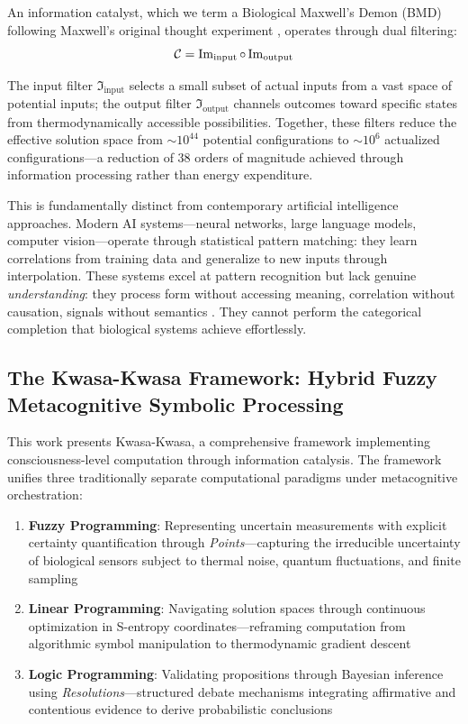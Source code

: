 An information catalyst, which we term a Biological Maxwell's Demon (BMD) following Maxwell's original thought experiment \cite{maxwell1871theory}, operates through dual filtering:
\begin{equation}
\mathcal{C} = \Im_{\text{input}} \circ \Im_{\text{output}}
\end{equation}

The input filter $\Im_{\text{input}}$ selects a small subset of actual inputs from a vast space of potential inputs; the output filter $\Im_{\text{output}}$ channels outcomes toward specific states from thermodynamically accessible possibilities. Together, these filters reduce the effective solution space from $\sim 10^{44}$ potential configurations to $\sim 10^6$ actualized configurations—a reduction of 38 orders of magnitude achieved through information processing rather than energy expenditure.

This is fundamentally distinct from contemporary artificial intelligence approaches. Modern AI systems—neural networks, large language models, computer vision—operate through statistical pattern matching: they learn correlations from training data and generalize to new inputs through interpolation. These systems excel at pattern recognition but lack genuine \textit{understanding}: they process form without accessing meaning, correlation without causation, signals without semantics \cite{bender2020climbing}. They cannot perform the categorical completion that biological systems achieve effortlessly.

\subsection{The Kwasa-Kwasa Framework: Hybrid Fuzzy Metacognitive Symbolic Processing}

This work presents Kwasa-Kwasa, a comprehensive framework implementing consciousness-level computation through information catalysis. The framework unifies three traditionally separate computational paradigms under metacognitive orchestration:

\begin{enumerate}
\item \textbf{Fuzzy Programming}: Representing uncertain measurements with explicit certainty quantification through \textit{Points}—capturing the irreducible uncertainty of biological sensors subject to thermal noise, quantum fluctuations, and finite sampling
\item \textbf{Linear Programming}: Navigating solution spaces through continuous optimization in S-entropy coordinates—reframing computation from algorithmic symbol manipulation to thermodynamic gradient descent
\item \textbf{Logic Programming}: Validating propositions through Bayesian inference using \textit{Resolutions}—structured debate mechanisms integrating affirmative and contentious evidence to derive probabilistic conclusions
\end{enumerate}

